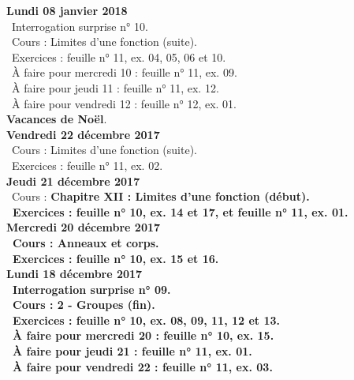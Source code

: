 \documentclass[12pt,a4paper]{article}
\begin{document}
\noindent\textbf{Lundi 08 janvier 2018} \\
\bu\ Interrogation surprise n° 10.\\
\bu\ Cours : Limites d'une fonction (suite).\\
\bu\ Exercices : feuille n° 11, ex. 04, 05, 06 et 10.\\
\bu\ À faire pour mercredi 10 : feuille n° 11, ex. 09.\\
\bu\ À faire pour jeudi 11 : feuille n° 11, ex. 12.\\
\bu\ À faire pour vendredi 12 : feuille n° 12, ex. 01.\vspace{.4cm}\\

\noindent\textbf{\bf Vacances de Noël}.\vspace{.4cm}\\

\noindent\textbf{Vendredi 22 décembre 2017}\\ 
\bu\ Cours : Limites d'une fonction (suite).\\
\bu\ Exercices : feuille n° 11, ex. 02.\vspace{.4cm}\\

\noindent\textbf{Jeudi 21 décembre 2017}\\
\bu\ Cours : \bf Chapitre XII \rm : Limites d'une fonction (début).\\
\bu\ Exercices : feuille n° 10, ex. 14 et 17, et feuille n° 11, ex. 01.\vspace{.4cm}\\

\noindent\textbf{\bf Mercredi 20 décembre 2017}\\
\bu\ Cours : Anneaux et corps.\\ 
\bu\ Exercices : feuille n° 10, ex. 15 et 16.\vspace{.4cm}\\

\noindent\textbf{Lundi 18 décembre 2017}\\
\bu\ Interrogation surprise n° 09.\\
\bu\ Cours : 2 - Groupes (fin).\\ 
\bu\ Exercices : feuille n° 10, ex. 08, 09, 11, 12 et 13.\\
\bu\ À faire pour mercredi 20 : feuille n° 10, ex. 15.\\
\bu\ À faire pour jeudi 21 : feuille n° 11, ex. 01.\\
\bu\ À faire pour vendredi 22 : feuille n° 11, ex. 03.\vspace{.4cm}\\
\end{document}

